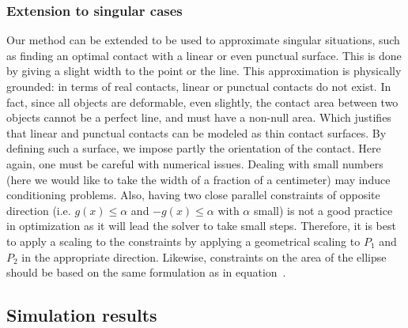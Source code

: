 \subsubsection{Extension to singular cases}
\label{subsubsec:singular_cases}
Our method can be extended to be used to approximate singular situations, such as finding an optimal contact with a linear or even punctual surface.
This is done by giving a slight width to the point or the line.
This approximation is physically grounded:
in terms of real contacts, linear or punctual contacts do not exist.
In fact, since all objects are deformable, even slightly, the contact area between two objects cannot be a perfect line, and must have a non-null area.
Which justifies that linear and punctual contacts can be modeled as thin contact surfaces.
By defining such a surface, we impose partly the orientation of the contact.
Here again, one must be careful with numerical issues.
Dealing with small numbers (here we would like to take the width of a fraction of a centimeter) may induce conditioning problems.
Also, having two close parallel constraints of opposite direction (i.e. $g(x)\leq \alpha$ and  $-g(x)\leq \alpha$ with $\alpha$ small) is not a good practice in optimization as it will lead the solver to take small steps.
Therefore, it is best to apply a scaling to the constraints by applying a geometrical scaling to $P_1$ and $P_2$ in the appropriate direction.\newline
Likewise, constraints on the area of the ellipse should be based on the same formulation as in equation~.



\subsection{Simulation results}
\label{subsec:simu}

